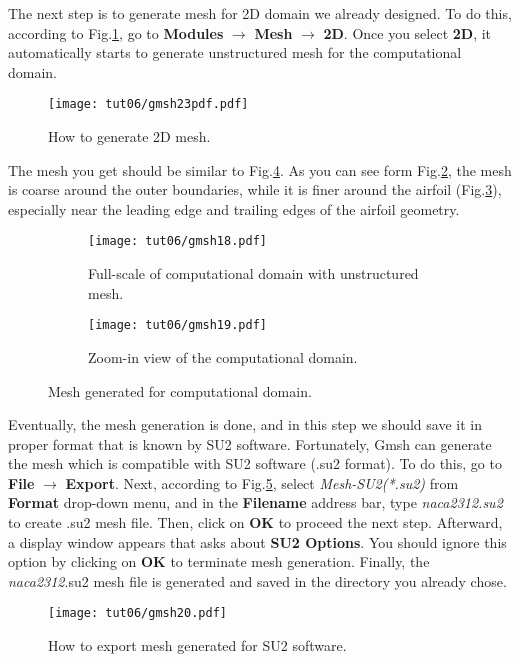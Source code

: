 The next step is to generate mesh for 2D domain we already designed. To do this, according to Fig.\ref{fig6:gmsh23}, go to \textbf{Modules} $\rightarrow$ \textbf{Mesh} $\rightarrow$ \textbf{2D}. Once you select \textbf{2D}, it  automatically starts to generate unstructured mesh for the computational domain.
\begin{figure}[htbp]
    \centering
    \texttt{[image: tut06/gmsh23pdf.pdf]}
    \caption{How to generate 2D mesh.}
    \label{fig6:gmsh23}
\end{figure}
The mesh you get should be similar to Fig.\ref{fig6:gmsh18}. As you can see form Fig.\ref{fig6:gmsh18 a}, the mesh is coarse around the outer boundaries, while it is finer around the airfoil (Fig.\ref{fig6:gmsh18 b}), especially near the leading edge and trailing edges of the airfoil geometry.
\begin{figure}[htbp]
    \centering
     \begin{subfigure}[b]{.75\textwidth}
         \centering
         \texttt{[image: tut06/gmsh18.pdf]}
         \caption{Full-scale of computational domain with unstructured mesh.}
         \label{fig6:gmsh18 a}
     \end{subfigure}
     \hfill
     \begin{subfigure}[b]{.75\textwidth}
         \centering
         \texttt{[image: tut06/gmsh19.pdf]}
         \caption{Zoom-in view of the computational domain.}
         \label{fig6:gmsh18 b}
     \end{subfigure}  
    \caption{Mesh generated for computational domain.}
    \label{fig6:gmsh18}
\end{figure}
Eventually, the mesh generation is done, and in this step we should save it in proper format that is known by SU2 software. Fortunately, Gmsh can generate the mesh which is compatible with SU2 software (.su2 format). To do this, go to \textbf{File} $\rightarrow$ \textbf{Export}. Next, according to Fig.\ref{fig6:gmsh20}, select \textit{Mesh-SU2(*.su2)} from \textbf{Format} drop-down menu, and in the \textbf{Filename} address bar, type \textit{naca2312.su2} to create .su2 mesh file. Then, click on \textbf{OK} to proceed the next step. Afterward, a display window appears that asks about \textbf{SU2 Options}. You should ignore this option by clicking on \textbf{OK} to terminate mesh generation. Finally, the \textit{naca2312}.su2 mesh file is generated and saved in the directory you already chose.
\begin{figure}[htbp]
    \centering
    \texttt{[image: tut06/gmsh20.pdf]}
    \caption{How to export mesh generated for SU2 software.}
    \label{fig6:gmsh20}
\end{figure}
